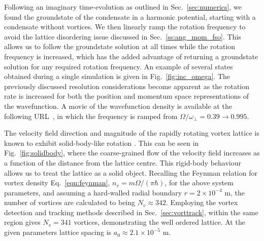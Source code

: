 Following an imaginary time-evolution as outlined in Sec.~\ref{sec:numerics}, we found the groundstate of the condensate in a harmonic potential, starting with a condensate without vortices. We then linearly ramp the rotation frequency to avoid the lattice disordering issue discussed in Sec.~\ref{ss:ang_mom_fso}. This allows us to follow the groundstate solution at all times while the rotation frequency is increased, which has the added advantage of returning a groundstate solution for any required rotation frequency. An example of several states obtained during a single simulation is given in Fig.~\ref{fig:inc_omega}. The previously discussed resolution considerations become apparent as the rotation rate is increased for both the position and momentum space representations of the wavefunction. A movie of the wavefunction density is available at the following URL~\cite{YT:BEC_gen}, in which the frequency is ramped from $\Omega/\omega_\perp = 0.39 \to 0.995$.

The velocity field direction and magnitude of the rapidly rotating vortex lattice is known to exhibit solid-body-like rotation \cite{Vtx:AboShaeer_sci_2001}. This can be seen in Fig.~\ref{fig:solidbody}, where the coarse-grained flow of the velocity field increases as a function of the distance from the lattice centre. This rigid-body behaviour allows us to treat the lattice as a solid object. Recalling the Feynman relation for vortex density Eq.~\eqref{eqn:feynman}, $n_v = m\Omega/(\pi\hbar)$, for the above system parameters, and assuming a hard-walled radial boundary $r=2\times 10^{-4}$ m, the number of vortices are calculated to being $N_v \approx 342$. Employing the vortex detection and tracking methods described in Sec.~\ref{sec:vorttrack}, within the same region gives $N_v = 341$ vortices, demonstrating the well ordered lattice. At the given parameters lattice spacing is $a_0 \approx 2.1\times 10^{-5}$ m.


